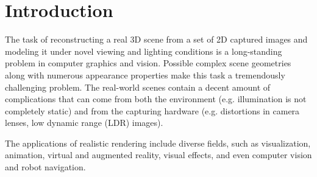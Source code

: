 \chapter{Introduction}
\label{chap:introduction}





The task of reconstructing a real 3D scene from a set of 2D captured images
and modeling it under novel viewing and lighting conditions
is a long-standing problem in computer graphics and vision.
Possible complex scene geometries along with numerous appearance properties
make this task a tremendously challenging problem.
The real-world scenes contain a decent amount of complications
that can come from both the environment (e.g. illumination is not completely static)
and from the capturing hardware (e.g. distortions in camera lenses, low dynamic range (LDR) images).

The applications of realistic rendering include diverse fields,
such as visualization, animation, virtual and augmented reality, visual effects,
and even computer vision and robot navigation.



